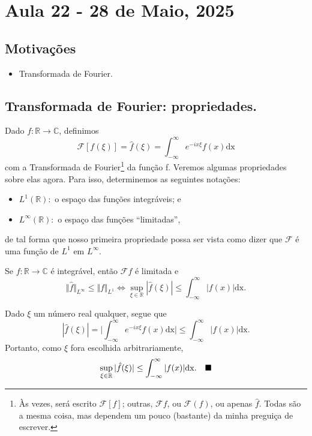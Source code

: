 \documentclass[../pde_notes.tex]{subfiles}
\begin{document}
\section{Aula 22 - 28 de Maio, 2025}
\subsection{Motivações}
\begin{itemize}
	\item Transformada de Fourier.
\end{itemize}
\subsection{Transformada de Fourier: propriedades.}
Dado \(f:\mathbb{R}\rightarrow \mathbb{C}\), definimos
\[
	\mathcal{F}[f(\xi )] = \hat{f}(\xi ) = \int_{-\infty}^{\infty}e^{-ix\xi }f(x) \mathrm{dx}
\]
com a Transformada de Fourier\footnote{Às vezes, será escrito \(\mathcal{F}[f]\); outras, \(\mathcal{F}f\), ou \(\mathcal{F}(f)\), ou apenas \(\hat{f}\). Todas são a mesma coisa, mas dependem um pouco (bastante) da minha preguiça de escrever.} da função f. Veremos algumas propriedades sobre elas agora. Para isso, determinemos as seguintes notações:
\begin{itemize}
	\item \(L^{1}(\mathbb{R}):\) o espaço das funções integráveis; e
	\item \(L^{\infty}(\mathbb{R}):\) o espaço das funções ``limitadas'',
\end{itemize}
de tal forma que nosso primeira propriedade possa ser vista como dizer que \(\mathcal{F}\) é uma função de \(L^{1}\) em \(L^{\infty}\).
\begin{prop*}
	Se \(f:\mathbb{R}\rightarrow \mathbb{C}\) é integrável, então \(\mathcal{F}f\) é limitada e
	\[
		\Vert \hat{f} \Vert_{L^{\infty}}\leq \Vert f \Vert_{L^{1}} \Longleftrightarrow \sup_{\xi \in \mathbb{R}}|\hat{f}(\xi )| \leq \int_{-\infty}^{\infty}|f(x)| \mathrm{dx}.
	\]
\end{prop*}
\begin{proof*}
	Dado \(\xi \) um número real qualquer, segue que
	\[
		|\hat{f}(\xi )| = \biggl\vert \int_{-\infty}^{\infty}e^{-ix\xi }f(x) \mathrm{dx} \biggr\vert\leq \int_{-\infty}^{\infty}|f(x)| \mathrm{dx}.
	\]
	Portanto, como \(\xi \) fora escolhida arbitrariamente,
	\[
		\sup_{\xi \in \mathbb{R}}|\hat{f}(\xi )| \leq \int_{-\infty}^{\infty}|f(x)| \mathrm{dx}.\quad \text{$\blacksquare$}
	\]
\end{proof*}
\end{document}
